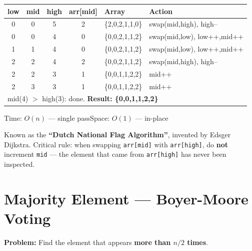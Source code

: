 \documentclass[12pt,a4paper,oneside]{book}
\begin{document}
\begin{dryrun}[Dry Run: arr = \{2, 0, 2, 1, 1, 0\}]
\begin{center}
\begin{tabular}{ccccll}
\toprule
\textbf{low} & \textbf{mid} & \textbf{high} & \textbf{arr[mid]} & \textbf{Array} & \textbf{Action}\\
\midrule
0 & 0 & 5 & 2 & \{2,0,2,1,1,0\} & swap(mid,high), high--\\
0 & 0 & 4 & 0 & \{0,0,2,1,1,2\} & swap(mid,low), low++,mid++\\
1 & 1 & 4 & 0 & \{0,0,2,1,1,2\} & swap(mid,low), low++,mid++\\
2 & 2 & 4 & 2 & \{0,0,2,1,1,2\} & swap(mid,high), high--\\
2 & 2 & 3 & 1 & \{0,0,1,1,2,2\} & mid++\\
2 & 3 & 3 & 1 & \{0,0,1,1,2,2\} & mid++\\
\multicolumn{6}{l}{mid(4) $>$ high(3): done. \textbf{Result: \{0,0,1,1,2,2\}}}\\
\bottomrule
\end{tabular}
\end{center}
\end{dryrun}

\begin{complexity}
Time: $O(n)$ --- single pass\quad Space: $O(1)$ --- in-place
\end{complexity}

\begin{interviewcorner}
Known as the \textbf{``Dutch National Flag Algorithm''}, invented by Edsger Dijkstra. Critical rule: when swapping \texttt{arr[mid]} with \texttt{arr[high]}, do \textbf{not} increment \texttt{mid} --- the element that came from \texttt{arr[high]} has never been inspected.
\end{interviewcorner}

\section{Majority Element --- Boyer-Moore Voting}

\textbf{Problem:} Find the element that appears \textbf{more than $n/2$ times}.
\end{document}
